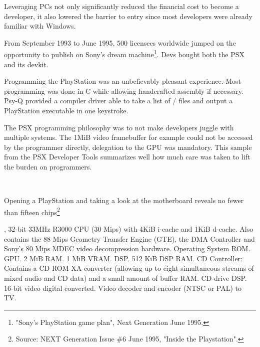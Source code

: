 \vspace{-10pt}
\par
Leveraging PCs not only significantly reduced the financial cost to become a developer, it also lowered the barrier to entry since most developers were already familiar with Windows.\\
\par
From September 1993 to June 1995, 500 licensees worldwide jumped on the opportunity to publish on Sony's dream machine\footnote{"Sony's PlayStation game plan", Next Generation June 1995.}. Devs bought both the PSX and its devkit.

Programming the PlayStation was an unbelievably pleasant experience. Most programming was done in C while allowing handcrafted assembly if necessary. Psy-Q provided a compiler driver able to take a list of / files and output a PlayStation executable in one keystroke.\\
\par
The PSX programming philosophy was to not make developers juggle with multiple systems. The 1MiB video framebuffer for example could not be accessed by the programmer directly, delegation to the GPU was mandatory. This sample from the PSX Developer Tools summarizes well how much care was taken to lift the burden on programmers.\\
\par
{}\\
\par
{}
\par









\par
Opening a PlayStation and taking a look at the motherboard reveals no fewer than fifteen chips\footnote{Source: NEXT Generation Issue \#6 June 1995, "Inside the Playstation".}\\
\par
{}, 32-bit 33MHz R3000 CPU (30 Mips) with  4KiB i-cache and 1KiB d-cache. Also contains the 88 Mips Geometry Transfer Engine (GTE), the DMA Controller and Sony's 80 Mips MDEC video decompression hardware.
 Operating System ROM.
 GPU.
 2 MiB RAM.
 1 MiB VRAM.
 DSP.
 512 KiB DSP RAM.
 CD Controller: Contains a CD ROM-XA converter (allowing up to eight simultaneous streams of mixed audio and CD data) and a small amount of buffer RAM.
 CD-drive DSP.
 16-bit video digital converted.
 Video decoder and encoder (NTSC or PAL) to TV.



